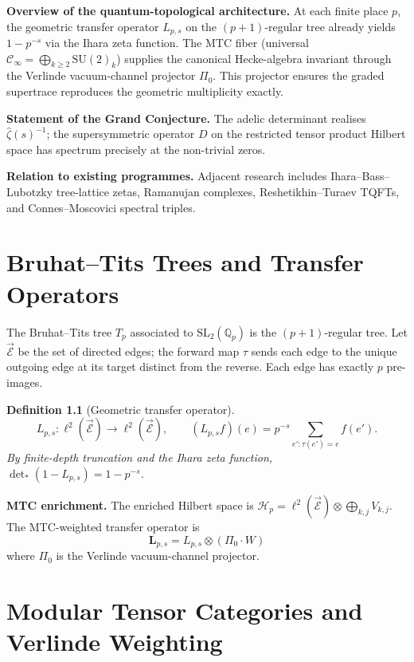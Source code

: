 \documentclass[11pt, oneside]{book}
\newtheorem{definition}[theorem]{Definition}
\begin{document}
\textbf{Overview of the quantum-topological architecture.} At each finite place \(p\), the geometric transfer operator \(L_{p,s}\) on the \((p+1)\)-regular tree already yields \(1-p^{-s}\) via the Ihara zeta function. The MTC fiber (universal \(\mathcal{C}_\infty = \bigoplus_{k\ge 2} \mathrm{SU}(2)_k\)) supplies the canonical Hecke-algebra invariant through the Verlinde vacuum-channel projector \(\Pi_0\). This projector ensures the graded supertrace reproduces the geometric multiplicity exactly.

\textbf{Statement of the Grand Conjecture.} The adelic determinant realises \(\hat{\zeta}(s)^{-1}\); the supersymmetric operator \(D\) on the restricted tensor product Hilbert space has spectrum precisely at the non-trivial zeros.

\textbf{Relation to existing programmes.} Adjacent research includes Ihara--Bass--Lubotzky tree-lattice zetas, Ramanujan complexes, Reshetikhin--Turaev TQFTs, and Connes--Moscovici spectral triples.

\chapter{Bruhat--Tits Trees and Transfer Operators}
\label{ch:trees}

The Bruhat--Tits tree \(T_p\) associated to \(\mathrm{SL}_2(\mathbb{Q}_p)\) is the \((p+1)\)-regular tree. Let \(\vec{\mathcal{E}}\) be the set of directed edges; the forward map \(\tau\) sends each edge to the unique outgoing edge at its target distinct from the reverse. Each edge has exactly \(p\) pre-images.

\begin{definition}[Geometric transfer operator]
\[
L_{p,s}:\ell^2(\vec{\mathcal{E}})\to\ell^2(\vec{\mathcal{E}}),\qquad (L_{p,s}f)(e)=p^{-s}\sum_{e':\tau(e')=e}f(e').
\]
By finite-depth truncation and the Ihara zeta function, \(\det_*(1-L_{p,s})=1-p^{-s}\).
\end{definition}

\textbf{MTC enrichment.} The enriched Hilbert space is \(\mathcal{H}_p=\ell^2(\vec{\mathcal{E}})\otimes\bigoplus_{k,j}V_{k,j}\). The MTC-weighted transfer operator is
\[
\mathbf{L}_{p,s}=L_{p,s}\otimes(\Pi_0\cdot W)
\]
where \(\Pi_0\) is the Verlinde vacuum-channel projector.

\chapter{Modular Tensor Categories and Verlinde Weighting}
\label{ch:mtc}
\end{document}
